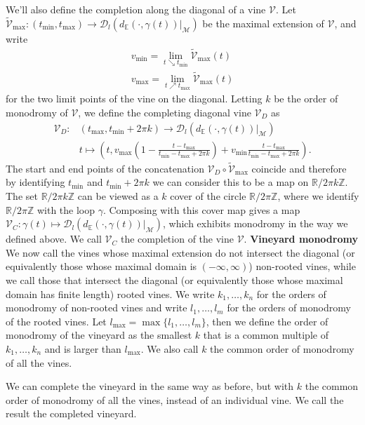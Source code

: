 \documentclass[twoside,leqno]{article}
\newcommand{\M}{\mathcal{M}}
\newcommand{\Per}{\mathscr{D}}
\begin{document}
\begin{definition}
We'll also define the completion along the diagonal of a vine $\mathcal{V}$. Let $\tilde{\mathcal{V}}_{\max}: (t_{\min},t_{\max}) \to \Per_l (d_\mathbb{E}(\cdot, \gamma(t) )|_\M)$ be the maximal extension of $\mathcal{V}$, and write 
\begin{align} 
v_{\min} = \lim_{t \searrow t_{\min} } \tilde{\mathcal{V}}_{\max} (t) 
\nonumber
\\
v_{\max} = \lim_{t \nearrow t_{\max} } \tilde{\mathcal{V}}_{\max} (t) 
\nonumber 
\end{align} 
for the two limit points of the vine on the diagonal. 
Letting $k$ be the order of monodromy of $\mathcal{V}$, we define the completing diagonal vine $\mathcal{V}_D$ as 
\begin{align} 
\mathcal{V}_D :& (t_{\max} , t_{\min} + 2 \pi k) \to  \Per_l (d_\mathbb{E}(\cdot, \gamma(t) )|_\M)
\nonumber 
\\
& t \mapsto 
\left (t ,v_{\max} \left (1 -\frac{t-t_{\max}}{t_{\min} - t_{\max} + 2 \pi k} \right) + v_{\min} \frac{t-t_{\max}}{t_{\min} - t_{\max} + 2 \pi k}   \right) .
\nonumber 
\end{align} 
The start and end points of the concatenation $\mathcal{V}_D \circ \tilde{\mathcal{V}}_{\max}$ coincide and therefore by identifying $t_{\min}$ and $t_{\min} + 2 \pi k$ we can consider this to be a map on $\mathbb{R} / 2 \pi k \mathbb{Z}$. The set $\mathbb{R} / 2 \pi k \mathbb{Z}$  can be viewed as a $k$ cover of the circle $\mathbb{R} / 2 \pi \mathbb{Z}$, where we identify $\mathbb{R} / 2 \pi \mathbb{Z}$ with the loop $\gamma$. Composing with this cover map gives a map $\mathcal{V}_C : \gamma(t) \mapsto  \Per_l (d_\mathbb{E}(\cdot, \gamma(t) )|_\M)$, which exhibits monodromy in the way we defined above. We call $\mathcal{V}_C$ the completion of the vine $\mathcal{V}$.  
\newline
\textbf{Vineyard monodromy}
We now call the vines whose maximal extension do not intersect the diagonal (or equivalently those whose maximal domain is $(-\infty, \infty)$) non-rooted vines, while we call those that intersect the diagonal (or equivalently those whose maximal domain has finite length) rooted vines.  
We write $k_1, \dots , k_n$ for the orders of monodromy of non-rooted vines and write $l_1 ,\dots, l_m$ for the orders of monodromy of the rooted vines. Let $l_{\max} = \max \{ l_1 ,\dots, l_m\}$, then we define the order of monodromy of the vineyard as the smallest $k$ that is a common multiple of $k_1, \dots , k_n$ and is larger than $l_{\max}$. We also call $k$ the common order of monodromy of all the vines.  

We can complete the vineyard in the same way as before, but with $k$ the common order of monodromy of all the vines, instead of an individual vine. We call the result the completed vineyard. 
\end{definition} 
\end{document}
